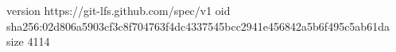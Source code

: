 version https://git-lfs.github.com/spec/v1
oid sha256:02d806a5903cf3c8f704763f4dc4337545bcc2941e456842a5b6f495c5ab61da
size 4114
